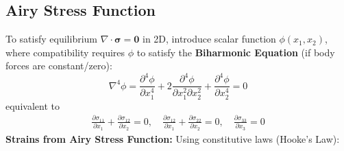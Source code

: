 \documentclass[10pt,twocolumn, a4paper]{article}
\begin{document}
\subsection{Airy Stress Function}
To satisfy equilibrium $\nabla \cdot \bm{\sigma} = \bm{0}$ in 2D, introduce scalar function $\phi(x_1, x_2)$, where compatibility requires $\phi$ to satisfy the \textbf{Biharmonic Equation} (if body forces are constant/zero):
\[ \nabla^4 \phi = \frac{\partial^4 \phi}{\partial x_1^4} + 2\frac{\partial^4 \phi}{\partial x_1^2 \partial x_2^2} + \frac{\partial^4 \phi}{\partial x_2^4} = 0 \]
equivalent to 
\begin{align*}
    \frac{\partial \sigma_{11}}{\partial x_{1}} + \frac{\partial \sigma_{12}}{\partial x_{2}} = 0, \quad \frac{\partial \sigma_{12}}{\partial x_{1}} + \frac{\partial \sigma_{22}}{\partial x_{2}} = 0, \quad \frac{\partial \sigma_{33}}{\partial x_{3}} = 0
\end{align*}
\textbf{Strains from Airy Stress Function:}
Using constitutive laws (Hooke's Law):
\end{document}
